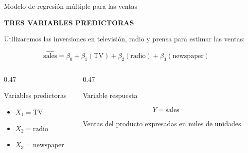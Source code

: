 \documentclass[aspectratio=169,11pt]{beamer}
\newcommand{\kicker}[1]{%
  {\scriptsize\bfseries\color{cAcc}\MakeUppercase{#1}}%
  \par\vspace{0.2em}%
}
\newenvironment{cerrado}[1]
  {\begin{block}{#1}
   \begin{minipage}{\linewidth}
   \raggedright}
  {\end{minipage}
   \end{block}}
\begin{document}
\begin{frame}{Modelo de regresión múltiple para las ventas}

  \begin{center}
    \begin{minipage}{0.90\textwidth}

      \small

      \kicker{TRES VARIABLES PREDICTORAS}

      Utilizaremos las inversiones en televisión, radio y prensa
      para estimar las ventas:

      \vspace{-0.2em}

      \[
        \widehat{\text{sales}}
        =
        \beta_0
        + \beta_1(\text{TV})
        + \beta_2(\text{radio})
        + \beta_3(\text{newspaper})
      \]

      \vspace{-0.4em}

      \begin{columns}[T,onlytextwidth]

        \begin{column}{0.47\textwidth}

          \begin{cerrado}{Variables predictoras}

            \begin{itemize}
              \setlength{\itemsep}{0.2em}

              \item \(X_1=\text{TV}\)
              \item \(X_2=\text{radio}\)
              \item \(X_3=\text{newspaper}\)

            \end{itemize}

          \end{cerrado}

        \end{column}

        \begin{column}{0.47\textwidth}

          \begin{cerrado}{Variable respuesta}

            \[
              Y=\text{sales}
            \]

            Ventas del producto expresadas en miles de unidades.

          \end{cerrado}


\end{column}
\end{columns}
\end{minipage}
\end{center}
\end{frame}
\end{document}
